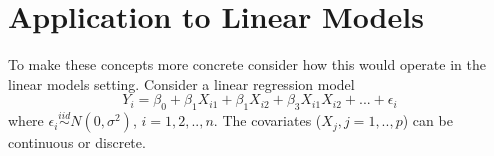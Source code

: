 \documentclass{article}
\begin{document}
%


%
%
%

\section{Application to Linear Models} \label{sec:regression}

To make these concepts more concrete consider how this would operate in the linear models setting. Consider a linear regression model 
\begin{equation}\label{multi} Y_i = \beta_0 + \beta_1 X_{i1} + \beta_1 X_{i2} + \beta_3 X_{i1}X_{i2} + ... + \epsilon_i 
\end{equation}
where $\epsilon_i \stackrel{iid}{ \sim } N(0,\sigma^2)$, $i=1,2, .., n$. The covariates ($X_j, j=1,..,p$) can be continuous or discrete.
\end{document}
